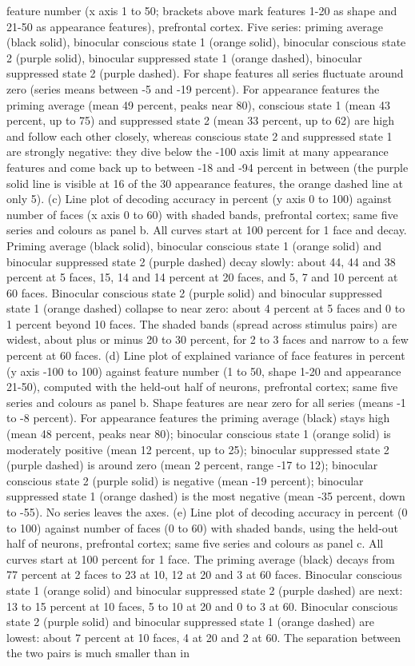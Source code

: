 \documentclass{article}
\begin{document}
feature number (x axis 1 to 50; brackets above mark features 1-20 as shape and 21-50 as appearance features), prefrontal cortex. Five series: priming average (black solid), binocular conscious state 1 (orange solid), binocular conscious state 2 (purple solid), binocular suppressed state 1 (orange dashed), binocular suppressed state 2 (purple dashed). For shape features all series fluctuate around zero (series means between -5 and -19 percent). For appearance features the priming average (mean 49 percent, peaks near 80), conscious state 1 (mean 43 percent, up to 75) and suppressed state 2 (mean 33 percent, up to 62) are high and follow each other closely, whereas conscious state 2 and suppressed state 1 are strongly negative: they dive below the -100 axis limit at many appearance features and come back up to between -18 and -94 percent in between (the purple solid line is visible at 16 of the 30 appearance features, the orange dashed line at only 5). (c) Line plot of decoding accuracy in percent (y axis 0 to 100) against number of faces (x axis 0 to 60) with shaded bands, prefrontal cortex; same five series and colours as panel b. All curves start at 100 percent for 1 face and decay. Priming average (black solid), binocular conscious state 1 (orange solid) and binocular suppressed state 2 (purple dashed) decay slowly: about 44, 44 and 38 percent at 5 faces, 15, 14 and 14 percent at 20 faces, and 5, 7 and 10 percent at 60 faces. Binocular conscious state 2 (purple solid) and binocular suppressed state 1 (orange dashed) collapse to near zero: about 4 percent at 5 faces and 0 to 1 percent beyond 10 faces. The shaded bands (spread across stimulus pairs) are widest, about plus or minus 20 to 30 percent, for 2 to 3 faces and narrow to a few percent at 60 faces. (d) Line plot of explained variance of face features in percent (y axis -100 to 100) against feature number (1 to 50, shape 1-20 and appearance 21-50), computed with the held-out half of neurons, prefrontal cortex; same five series and colours as panel b. Shape features are near zero for all series (means -1 to -8 percent). For appearance features the priming average (black) stays high (mean 48 percent, peaks near 80); binocular conscious state 1 (orange solid) is moderately positive (mean 12 percent, up to 25); binocular suppressed state 2 (purple dashed) is around zero (mean 2 percent, range -17 to 12); binocular conscious state 2 (purple solid) is negative (mean -19 percent); binocular suppressed state 1 (orange dashed) is the most negative (mean -35 percent, down to -55). No series leaves the axes. (e) Line plot of decoding accuracy in percent (0 to 100) against number of faces (0 to 60) with shaded bands, using the held-out half of neurons, prefrontal cortex; same five series and colours as panel c. All curves start at 100 percent for 1 face. The priming average (black) decays from 77 percent at 2 faces to 23 at 10, 12 at 20 and 3 at 60 faces. Binocular conscious state 1 (orange solid) and binocular suppressed state 2 (purple dashed) are next: 13 to 15 percent at 10 faces, 5 to 10 at 20 and 0 to 3 at 60. Binocular conscious state 2 (purple solid) and binocular suppressed state 1 (orange dashed) are lowest: about 7 percent at 10 faces, 4 at 20 and 2 at 60. The separation between the two pairs is much smaller than in 
\end{document}
